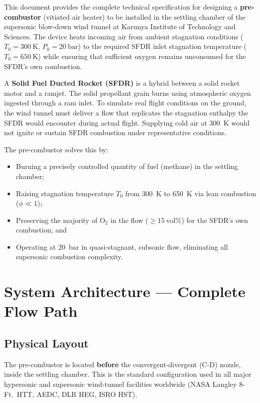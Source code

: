 \documentclass[12pt,a4paper]{report}
\begin{document}
This document provides the complete technical specification for designing a
\textbf{pre-combustor} (vitiated air heater) to be installed in the settling
chamber of the supersonic blow-down wind tunnel at Karunya Institute of
Technology and Sciences. The device heats incoming air from ambient stagnation
conditions ($T_0=300\ \text{K}$, $P_0=20\ \text{bar}$) to the required SFDR
inlet stagnation temperature ($T_0=650\ \text{K}$) while ensuring that
sufficient oxygen remains unconsumed for the SFDR's own combustion.

\medskip
A \textbf{Solid Fuel Ducted Rocket (SFDR)} is a hybrid between a solid rocket
motor and a ramjet. The solid propellant grain burns using atmospheric oxygen
ingested through a ram inlet. To simulate real flight conditions on the ground,
the wind tunnel must deliver a flow that replicates the stagnation enthalpy the
SFDR would encounter during actual flight. Supplying cold air at 300~K would
not ignite or sustain SFDR combustion under representative conditions.

\medskip
The pre-combustor solves this by:
\begin{itemize}[leftmargin=1.5em]
  \item Burning a precisely controlled quantity of fuel (methane) in the
        settling chamber;
  \item Raising stagnation temperature $T_0$ from 300~K to 650~K via lean
        combustion ($\phi \ll 1$);
  \item Preserving the majority of $\text{O}_2$ in the flow ($\geq 15\ \text{vol\%}$)
        for the SFDR's own combustion; and
  \item Operating at 20~bar in quasi-stagnant, subsonic flow, eliminating all
        supersonic combustion complexity.
\end{itemize}

\chapter{System Architecture — Complete Flow Path}

\section{Physical Layout}

The pre-combustor is located \textbf{before} the convergent-divergent (C-D)
nozzle, inside the settling chamber. This is the standard configuration used
in all major hypersonic and supersonic wind-tunnel facilities worldwide (NASA
Langley 8-Ft.\ HTT, AEDC, DLR HEG, ISRO HST).
\end{document}
